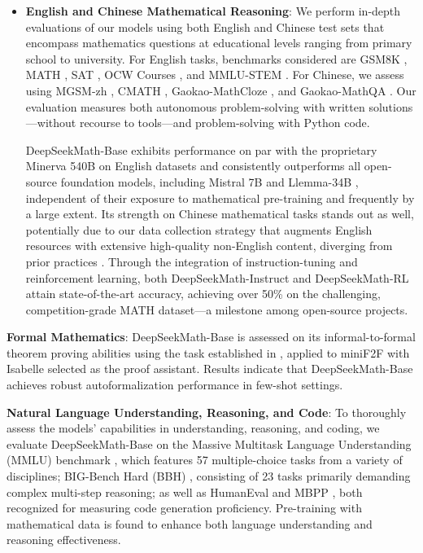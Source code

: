 \begin{itemize}[topsep=0pt]
    \item \textbf{English and Chinese Mathematical Reasoning}: We perform in-depth evaluations of our models using both English and Chinese test sets that encompass mathematics questions at educational levels ranging from primary school to university. For English tasks, benchmarks considered are GSM8K \citep{gsm8k}, MATH \citep{MATH}, SAT \citep{llemma}, OCW Courses \citep{minerva}, and MMLU-STEM \citep{mmlu}. For Chinese, we assess using MGSM-zh \citep{mgsm}, CMATH \citep{wei2023cmath}, Gaokao-MathCloze \citep{agieval}, and Gaokao-MathQA \citep{agieval}. Our evaluation measures both autonomous problem-solving with written solutions—without recourse to tools—and problem-solving with Python code.

    DeepSeekMath-Base exhibits performance on par with the proprietary Minerva 540B \citep{minerva} on English datasets and consistently outperforms all open-source foundation models, including Mistral 7B \citep{mistral} and Llemma-34B \citep{llemma}, independent of their exposure to mathematical pre-training and frequently by a large extent. Its strength on Chinese mathematical tasks stands out as well, potentially due to our data collection strategy that augments English resources with extensive high-quality non-English content, diverging from prior practices \citep{minerva,llemma}. Through the integration of instruction-tuning and reinforcement learning, both DeepSeekMath-Instruct and DeepSeekMath-RL attain state-of-the-art accuracy, achieving over 50\% on the challenging, competition-grade MATH dataset—a milestone among open-source projects.
\end{itemize}

\item \textbf{Formal Mathematics}: DeepSeekMath-Base is assessed on its informal-to-formal theorem proving abilities using the task established in \citep{dsp_proof}, applied to miniF2F \citep{minif2f} with Isabelle \citep{isabelle} selected as the proof assistant. Results indicate that DeepSeekMath-Base achieves robust autoformalization performance in few-shot settings.
\item \textbf{Natural Language Understanding, Reasoning, and Code}: To thoroughly assess the models' capabilities in understanding, reasoning, and coding, we evaluate DeepSeekMath-Base on the Massive Multitask Language Understanding (MMLU) benchmark \citep{mmlu}, which features 57 multiple-choice tasks from a variety of disciplines; BIG-Bench Hard (BBH) \citep{bbh}, consisting of 23 tasks primarily demanding complex multi-step reasoning; as well as HumanEval \citep{codex} and MBPP \citep{mbpp}, both recognized for measuring code generation proficiency. Pre-training with mathematical data is found to enhance both language understanding and reasoning effectiveness.

